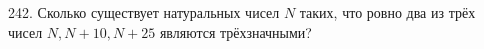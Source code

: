 242. Сколько существует натуральных чисел $N$ таких, что ровно два из трёх чисел $N, N+10, N+25$ являются трёхзначными?\\
